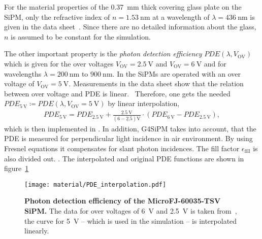 For the material properties of the \SI{0.37}{\milli\meter} thick covering glass plate on the SiPM, only the refractive index of $n = \SI{1.53}{\nano\meter}$ at a wavelength of $\lambda = \SI{436}{\nano\meter}$ is given in the data sheet~\cite{sipm:datasheet}. Since there are no detailed information about the glass, $n$ is assumed to be constant for the simulation.

The other important property is the \textit{photon detection efficiency} $PDE(\lambda,V_\text{OV})$ which is given for the over voltages $V_\text{OV}=\SI{2.5}{\volt}$ and $V_\text{OV}=\SI{6}{\volt}$ and for wavelengths $\lambda = \SI{200}{\nano\meter}$ to $\SI{900}{\nano\meter}$. In \iceact the SiPMs are operated with an over voltage of $V_\text{OV} = \SI{5}{\volt}$. Measurements in the data sheet show that the relation between over voltage and PDE is linear.~\cite{sipm:datasheet} Therefore, one gets the needed $PDE_{\SI{5}{\volt}}\coloneqq PDE(\lambda,V_\text{OV}=\SI{5}{\volt})$ by linear interpolation,
\begin{align}
	PDE_{\SI{5}{\volt}} = PDE_{\SI{2.5}{\volt}} + \frac{\SI{2.5}{\volt}}{(6-2.5)\si{\volt}} \cdot (PDE_{\SI{6}{\volt}}-PDE_{\SI{2.5}{\volt}}),
\end{align}
which is then implemented in \geant. In addition, G4SiPM takes into account, that the PDE is measured for perpendicular light incidence in air environment. By using Fresnel equations it compensates for slant photon incidences. The fill factor $\epsilon_\text{fill}$ is also divided out. \cite{sipm:g4sipm,famous:niggemann}. 
The interpolated and original PDE functions are shown in figure~\ref{sipm:pde}

\begin{figure}[H]
	\centering
	\texttt{[image: material/PDE\_interpolation.pdf]}
	\caption[Photon detection efficiency of the MicroFJ-60035-TSV SiPM]{\textbf{Photon detection efficiency of the MicroFJ-60035-TSV SiPM.} The data for over voltages of \SI{6}{\volt} and \SI{2.5}{\volt} is taken from~\cite{sipm:datasheet}, the curve for \SI{5}{\volt} -- which is used in the \geant simulation -- is interpolated linearly.}
	\label{sipm:pde}	
\end{figure}
